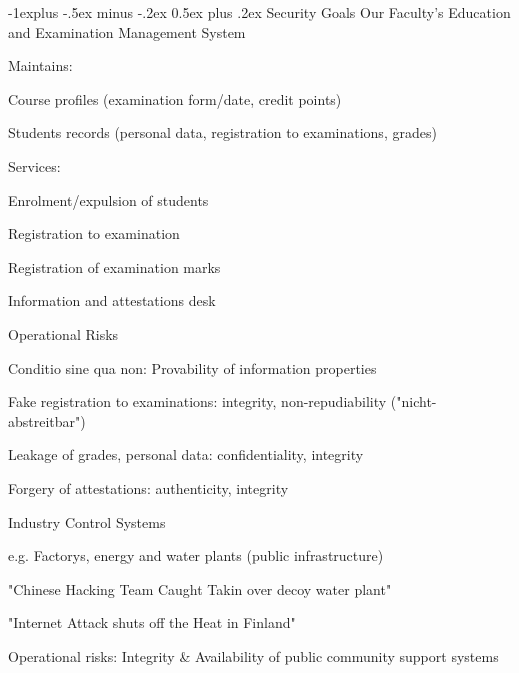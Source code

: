 \documentclass[a4paper]{article}
\makeatletter
\renewcommand{\subsection}{\@startsection{subsection}{2}{0mm}%
                                {-1explus -.5ex minus -.2ex}%
                                {0.5ex plus .2ex}%
                                {\normalfont\normalsize\bfseries}}
\makeatother
\begin{document}
\begin{multicols}{3}
    \subsection{Security Goals}
    Our Faculty's Education and Examination Management System
    \begin{itemize*}
        \item Maintains:
              \begin{itemize*}
                  \item Course profiles (examination form/date, credit points)
                  \item Students records (personal data, registration to examinations, grades)
              \end{itemize*}
        \item Services:
              \begin{itemize*}
                  \item Enrolment/expulsion of students
                  \item Registration to examination
                  \item Registration of examination marks
                  \item Information and attestations desk
              \end{itemize*}
        \item Operational Risks
              \begin{itemize*}
                  \item Conditio sine qua non: Provability of information properties
                  \item Fake registration to examinations: integrity, non-repudiability ("nicht-abstreitbar")
                  \item Leakage of grades, personal data: confidentiality, integrity
                  \item Forgery of attestations: authenticity, integrity
              \end{itemize*}
    \end{itemize*}

    Industry Control Systems
    \begin{itemize*}
        \item e.g. Factorys, energy and water plants (public infrastructure)
              \begin{itemize*}
                  \item "Chinese Hacking Team Caught Takin over decoy water plant"
                  \item "Internet Attack shuts off the Heat in Finland"
              \end{itemize*}
        \item Operational risks: Integrity \& Availability of public community support systems
    \end{itemize*}


\end{multicols}
\end{document}
